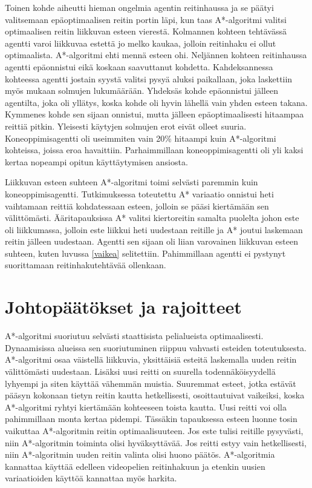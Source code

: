 \documentclass[utf8]{gradu3}
\begin{document}
Toinen kohde aiheutti hieman ongelmia agentin reitinhaussa ja se päätyi valitsemaan epäoptimaalisen reitin portin läpi, kun taas A*-algoritmi valitsi optimaalisen reitin liikkuvan esteen vierestä. Kolmannen kohteen tehtävässä agentti varoi liikkuvaa estettä jo melko kaukaa, jolloin reitinhaku ei ollut optimaalista. A*-algoritmi ehti mennä esteen ohi. Neljännen kohteen reitinhaussa agentti epäonnistui eikä koskaan saavuttanut kohdetta. Kahdeksannessa kohteessa agentti jostain syystä valitsi pysyä aluksi paikallaan, joka laskettiin myös mukaan solmujen lukumäärään. Yhdeksäs kohde epäonnistui jälleen agentilta, joka oli yllätys, koska kohde oli hyvin lähellä vain yhden esteen takana. Kymmenes kohde sen sijaan onnistui, mutta jälleen epäoptimaalisesti hitaampaa reittiä pitkin. Yleisesti käytyjen solmujen erot eivät olleet suuria. Koneoppimisagentti oli useimmiten vain 20\% hitaampi kuin A*-algoritmi kohteissa, joissa eroa havaittiin. Parhaimmillaan koneoppimisagentti oli yli kaksi kertaa nopeampi opitun käyttäytymisen ansiosta.

Liikkuvan esteen suhteen A*-algoritmi toimi selvästi paremmin kuin koneoppimisagentti. Tutkimuksessa toteutettu A* variaatio onnistui heti vaihtamaan reittiä kohdatessaan esteen, jolloin se pääsi kiertämään sen välittömästi. Ääritapauksissa A* valitsi kiertoreitin samalta puolelta johon este oli liikkumassa, jolloin este liikkui heti uudestaan reitille ja A* joutui laskemaan reitin jälleen uudestaan. Agentti sen sijaan oli liian varovainen liikkuvan esteen suhteen, kuten luvussa \ref{vaikea} selitettiin. Pahimmillaan agentti ei pystynyt suorittamaan reitinhakutehtävää ollenkaan.

\section{Johtopäätökset ja rajoitteet}
\label{johtop}

A*-algoritmi suoriutuu selvästi staattisista pelialueista optimaalisesti. Dynaamisissa alueissa sen suoriutuminen riippuu vahvasti esteiden toteutuksesta. A*-algoritmi osaa väistellä liikkuvia, yksittäisiä esteitä laskemalla uuden reitin välittömästi uudestaan. Lisäksi uusi reitti on suurella todennäköisyydellä lyhyempi ja siten käyttää vähemmän muistia. Suuremmat esteet, jotka estävät pääsyn kokonaan tietyn reitin kautta hetkellisesti, osoittautuivat vaikeiksi, koska A*-algoritmi ryhtyi kiertämään kohteeseen toista kautta. Uusi reitti voi olla pahimmillaan monta kertaa pidempi. Tässäkin tapauksessa esteen luonne tosin vaikuttaa A*-algoritmin reitin optimaalisuuteen. Jos este tulisi reitille pysyvästi, niin A*-algoritmin toiminta olisi hyväksyttävää. Jos reitti estyy vain hetkellisesti, niin A*-algoritmin uuden reitin valinta olisi huono päätös. A*-algoritmia kannattaa käyttää edelleen videopelien reitinhakuun ja etenkin uusien variaatioiden käyttöä kannattaa myös harkita.
\end{document}
